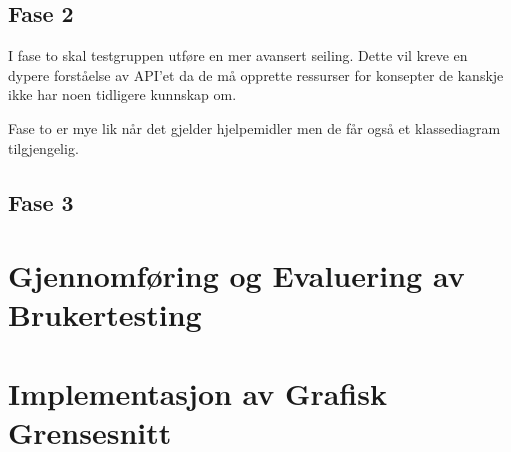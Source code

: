 \documentclass[12pt]{article}
\begin{document}
\newpage
\subsection{Fase 2}

I fase to skal testgruppen utføre en mer avansert seiling. Dette vil kreve en dypere forståelse av API'et da de må opprette ressurser
for konsepter de kanskje ikke har noen tidligere kunnskap om. 

Fase to er mye lik når det gjelder hjelpemidler men de får også et klassediagram tilgjengelig. 

\subsection{Fase 3}

\section{Gjennomføring og Evaluering av Brukertesting}

\section{Implementasjon av Grafisk Grensesnitt}
\end{document}
